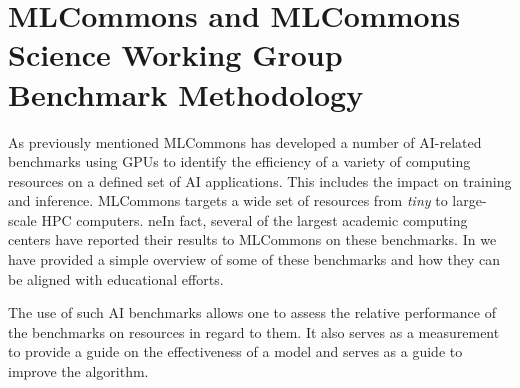\documentclass[sigplan,screen]{acmart}
\begin{document}
\begin{table}[!ht]
    \centering
    \caption{Related work, performance represents the accuracy per pixel for the cloud mask generated.}
    \label{tab:datasets}
\end{table}

\section{MLCommons and MLCommons Science Working Group Benchmark Methodology}

As previously mentioned MLCommons has developed a number of AI-related benchmarks using GPUs to identify the efficiency of a variety of computing resources on a defined set of AI applications. This includes the impact on training and inference. MLCommons targets a wide set of resources from {\em tiny} to large-scale HPC computers. neIn fact, several of the largest academic computing centers have reported their results to MLCommons on these benchmarks. In \cite{las23-insights-mlcommons-education} we have provided a simple overview of some of these benchmarks and how they can be aligned with educational efforts.

The use of such AI benchmarks allows one to assess the relative performance of the benchmarks on resources in regard to them.
It also serves as a measurement to provide a guide on the effectiveness of a model and serves as a guide to improve the algorithm. 
\end{document}

